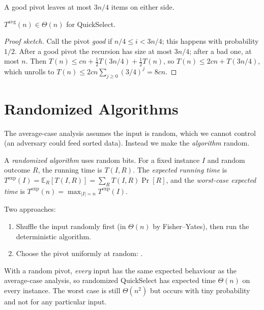 \begin{center}
\end{center}
A good pivot leaves at most $3n/4$ items on either side.

\begin{theorem}
$T^{\text{avg}}(n) \in \Theta(n)$ for QuickSelect.
\end{theorem}
\begin{proof}[Proof sketch]
Call the pivot \emph{good} if $n/4 \le i < 3n/4$; this happens with probability
$1/2$. After a good pivot the recursion has size at most $3n/4$; after a bad one,
at most $n$. Then
$T(n) \le cn + \tfrac12 T(3n/4) + \tfrac12 T(n)$, so $T(n) \le 2cn + T(3n/4)$,
which unrolls to $T(n) \le 2cn \sum_{j\ge0} (3/4)^j = 8cn$.
\end{proof}

\section{Randomized Algorithms}

The average-case analysis assumes the input is random, which we cannot control
(an adversary could feed sorted data). Instead we make the \emph{algorithm} random.

\begin{definition}
A \emph{randomized algorithm} uses random bits. For a fixed instance $I$ and
random outcome $R$, the running time is $T(I, R)$. The \emph{expected running
time} is $T^{\text{exp}}(I) = \mathbb E_R[T(I,R)] = \sum_R T(I,R)\Pr[R]$, and the
\emph{worst-case expected time} is $T^{\text{exp}}(n) = \max_{|I|=n} T^{\text{exp}}(I)$.
\end{definition}

Two approaches:
\begin{enumerate}
  \item Shuffle the input randomly first (in $\Theta(n)$ by Fisher--Yates), then run
        the deterministic algorithm.
  \item Choose the pivot uniformly at random: .
\end{enumerate}
With a random pivot, \emph{every} input has the same expected behaviour as the
average-case analysis, so randomized QuickSelect has expected time $\Theta(n)$
on every instance. The worst case is still $\Theta(n^2)$ but occurs with tiny
probability and not for any particular input.

